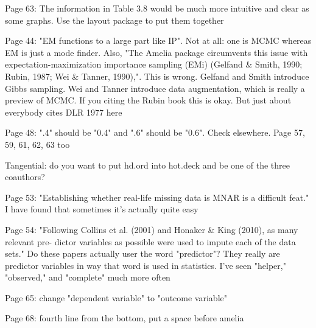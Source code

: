 \documentclass[12pt]{article}
\begin{document}
\begin{coi}
		\item Page 63: The information in Table 3.8 would be much more intuitive and clear as some graphs. Use the layout package to put them together
		\item Page 44: "EM functions to a large part like IP". Not at all: one is MCMC whereas EM is just a mode finder. Also, "The Amelia package circumvents this issue with expectation-maximization importance sampling (EMi) (Gelfand \& Smith, 1990; Rubin, 1987; Wei \& Tanner, 1990),". This is wrong. Gelfand and Smith introduce Gibbs sampling. Wei and Tanner introduce data augmentation, which is really a preview of MCMC. If you citing the Rubin book this is okay. But just about everybody cites DLR 1977 here
		\item Page 48: ".4" should  be "0.4" and ".6" should be "0.6". Check elsewhere. Page 57, 59, 61, 62, 63 too
		\item Tangential: do you want to put hd.ord into hot.deck and be one of the three coauthors?
		\item Page 53: "Establishing whether real-life missing data is MNAR is a difficult feat." I have found that sometimes it's actually quite easy
		\item Page 54: "Following Collins et al. (2001) and Honaker \& King (2010), as many relevant pre- dictor variables as possible were used to impute each of the data sets." Do these papers actually user the word "predictor"? They really are predictor variables in way that word is used in statistics. I've seen "helper," "observed," and "complete" much more often
		\item Page 65: change "dependent variable" to "outcome variable"
		\item Page 68: fourth line from the bottom, put a space before amelia
	\end{coi}
\end{document}
